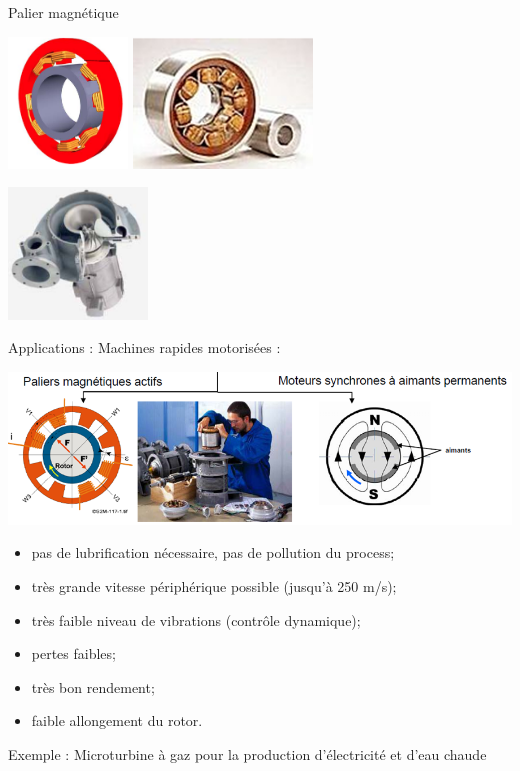 \documentclass[11pt,oneside]{article}
\begin{document}
\noindent\begin{minipage}[c]{.55\linewidth}
\begin{center}
Palier magnétique

\includegraphics[height=3.5cm]{png/fig31}
\includegraphics[height=3.5cm]{png/fig32}
\end{center}
\end{minipage}\hfill
\begin{minipage}[c]{.4\linewidth}
\begin{center}
\includegraphics[height=3.5cm]{png/fig33}
\end{center}
\end{minipage}

    
 
Applications : Machines rapides motorisées :

\begin{center}
\includegraphics[width=.9\textwidth]{png/fig34}
\end{center}

\begin{itemize}
\item pas de lubrification nécessaire, pas de pollution du process;
\item très grande vitesse périphérique possible (jusqu'à 250 m/s);
\item très faible niveau de vibrations (contrôle dynamique);
\item pertes faibles;
\item très bon rendement;
\item faible allongement du rotor.
\end{itemize}
Exemple : Microturbine à gaz pour la production d'électricité et d'eau chaude
  
\end{document}
